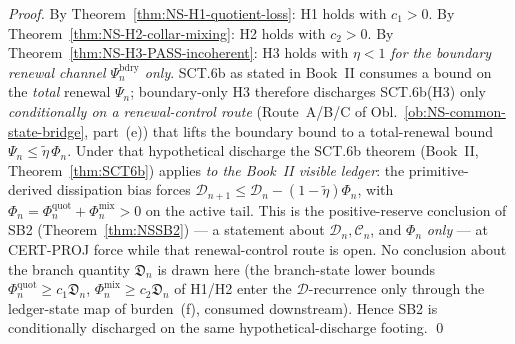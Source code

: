 \documentclass[12pt,oneside]{amsbook}
\theoremstyle{plain}
\theoremstyle{definition}
\theoremstyle{remark}
\begin{document}
\begin{proof}
By Theorem~\ref{thm:NS-H1-quotient-loss}: H1 holds with $c_1>0$.
By Theorem~\ref{thm:NS-H2-collar-mixing}: H2 holds with $c_2>0$.
By Theorem~\ref{thm:NS-H3-PASS-incoherent}: H3 holds with
$\eta<1$ \emph{for the boundary renewal channel
$\Psi_n^{\mathrm{bdry}}$ only}. SCT.6b as stated in Book~II
consumes a bound on the \emph{total} renewal $\Psi_n$; boundary-only
H3 therefore discharges SCT.6b(H3) only \emph{conditionally on a
renewal-control route} (Route~A/B/C of
Obl.~\ref{ob:NS-common-state-bridge}, part~(e)) that lifts the
boundary bound to a total-renewal bound
$\Psi_n \leq \widetilde\eta\,\Phi_n$. Under that hypothetical
discharge the SCT.6b theorem (Book~II, Theorem~\ref{thm:SCT6b})
applies \emph{to the Book~II visible ledger}: the
primitive-derived dissipation bias forces
$\mathcal{D}_{n+1} \leq \mathcal{D}_n -
(1-\widetilde\eta)\Phi_n$, with
$\Phi_n = \Phi_n^{\mathrm{quot}} + \Phi_n^{\mathrm{mix}} > 0$ on
the active tail. This is the positive-reserve conclusion of SB2
(Theorem~\ref{thm:NSSB2}) --- a statement about
$\mathcal{D}_n, \mathcal{C}_n$, and $\Phi_n$ \emph{only} --- at
CERT-PROJ force while that renewal-control route is open. No
conclusion about the branch quantity $\mathfrak{D}_n$ is drawn
here (the branch-state lower bounds
$\Phi^{\mathrm{quot}}_n \geq c_1\mathfrak{D}_n$,
$\Phi^{\mathrm{mix}}_n \geq c_2\mathfrak{D}_n$ of H1/H2 enter
the $\mathcal{D}$-recurrence only through the ledger-state map of
burden~(f), consumed downstream). Hence SB2 is conditionally
discharged on the same hypothetical-discharge footing. \qed
\end{proof}
\end{document}
